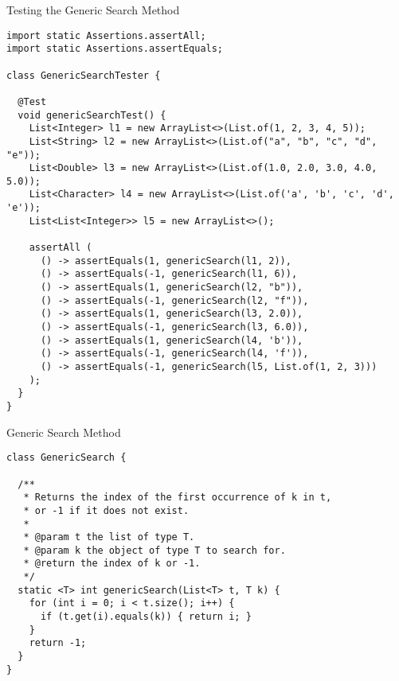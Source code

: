 
\begin{cl}{Testing the Generic Search Method}
\begin{lstlisting}[language=MyJava]
import static Assertions.assertAll;
import static Assertions.assertEquals;

class GenericSearchTester {

  @Test 
  void genericSearchTest() {
    List<Integer> l1 = new ArrayList<>(List.of(1, 2, 3, 4, 5));
    List<String> l2 = new ArrayList<>(List.of("a", "b", "c", "d", "e"));
    List<Double> l3 = new ArrayList<>(List.of(1.0, 2.0, 3.0, 4.0, 5.0));
    List<Character> l4 = new ArrayList<>(List.of('a', 'b', 'c', 'd', 'e'));
    List<List<Integer>> l5 = new ArrayList<>();

    assertAll (
      () -> assertEquals(1, genericSearch(l1, 2)),
      () -> assertEquals(-1, genericSearch(l1, 6)),
      () -> assertEquals(1, genericSearch(l2, "b")),
      () -> assertEquals(-1, genericSearch(l2, "f")),
      () -> assertEquals(1, genericSearch(l3, 2.0)),
      () -> assertEquals(-1, genericSearch(l3, 6.0)),
      () -> assertEquals(1, genericSearch(l4, 'b')),
      () -> assertEquals(-1, genericSearch(l4, 'f')),
      () -> assertEquals(-1, genericSearch(l5, List.of(1, 2, 3)))
    );
  }
}
\end{lstlisting}
\end{cl}

\begin{cl}{Generic Search Method}
\begin{lstlisting}[language=MyJava]
class GenericSearch {

  /**
   * Returns the index of the first occurrence of k in t, 
   * or -1 if it does not exist.
   *
   * @param t the list of type T.
   * @param k the object of type T to search for.
   * @return the index of k or -1.
   */
  static <T> int genericSearch(List<T> t, T k) {
    for (int i = 0; i < t.size(); i++) {
      if (t.get(i).equals(k)) { return i; }
    }
    return -1;
  }
}
\end{lstlisting}
\end{cl}

